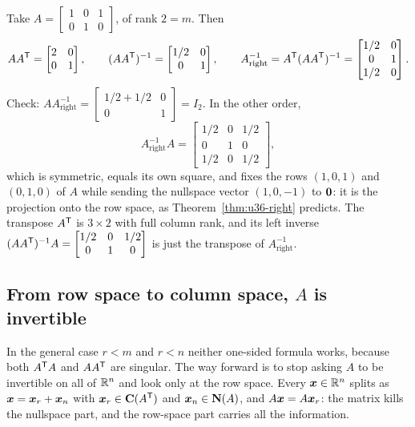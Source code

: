 \begin{example}\label{ex:u36-right}
Take $A=\begin{bmatrix}1&0&1\\0&1&0\end{bmatrix}$, of rank $2=m$. Then
\[
AA^{\mathsf{T}}=\begin{bmatrix}2&0\\0&1\end{bmatrix},\qquad (AA^{\mathsf{T}})^{-1}=\begin{bmatrix}1/2&0\\0&1\end{bmatrix},\qquad
A^{-1}_{\text{right}}=A^{\mathsf{T}}(AA^{\mathsf{T}})^{-1}=\begin{bmatrix}1/2&0\\0&1\\1/2&0\end{bmatrix}.
\]
Check: $AA^{-1}_{\text{right}}=\begin{bmatrix}1/2+1/2&0\\0&1\end{bmatrix}=I_2$. In the other order,
\[
A^{-1}_{\text{right}}A=\begin{bmatrix}1/2&0&1/2\\0&1&0\\1/2&0&1/2\end{bmatrix},
\]
which is symmetric, equals its own square, and fixes the rows $(1,0,1)$ and $(0,1,0)$ of $A$ while sending the nullspace vector $(1,0,-1)$ to $\boldsymbol{0}$: it is the projection onto the row space, as Theorem~\ref{thm:u36-right} predicts. The transpose $A^{\mathsf{T}}$ is $3\times 2$ with full column rank, and its left inverse $(AA^{\mathsf{T}})^{-1}A=\begin{bmatrix}1/2&0&1/2\\0&1&0\end{bmatrix}$ is just the transpose of $A^{-1}_{\text{right}}$.
\end{example}

\subsection{From row space to column space, \texorpdfstring{$A$}{A} is invertible}

In the general case $r<m$ and $r<n$ neither one-sided formula works, because both $A^{\mathsf{T}} A$ and $AA^{\mathsf{T}}$ are singular. The way forward is to stop asking $A$ to be invertible on all of $\mathbb{R}^n$ and look only at the row space. Every $\boldsymbol{x}\in\mathbb{R}^n$ splits as $\boldsymbol{x}=\boldsymbol{x}_r+\boldsymbol{x}_n$ with $\boldsymbol{x}_r\in\mathbf{C}(A^{\mathsf{T}})$ and $\boldsymbol{x}_n\in\mathbf{N}(A)$, and $A\boldsymbol{x}=A\boldsymbol{x}_r$: the matrix kills the nullspace part, and the row-space part carries all the information.


